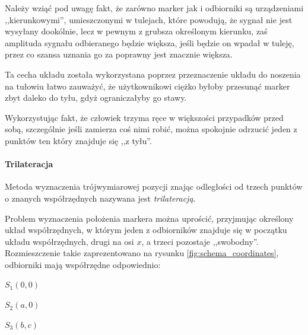 Należy wziąć pod uwagę fakt, że zarówno marker jak i odbiorniki są urządzeniami ,,kierunkowymi'', umieszczonymi w tulejach, które powodują, że sygnał nie jest wysyłany dookólnie, lecz w pewnym \ppauza z grubsza określonym \ppauza kierunku, zaś amplituda sygnału odbieranego będzie większa, jeśli będzie on wpadał w tuleję, przez co szansa uznania go za poprawny jest znacznie większa.

Ta cecha układu została wykorzystana poprzez przeznaczenie układu do noszenia na tułowiu \ppauza łatwo zauważyć, że użytkownikowi ciężko byłoby przesunąć marker zbyt daleko do tyłu, gdyż ograniczałyby go stawy. 

Wykorzystując fakt, że człowiek trzyma ręce w większości przypadków przed sobą, szczególnie jeśli zamierza coś nimi robić, można spokojnie odrzucić jeden z punktów \ppauza ten który znajduje się ,,z tyłu''.

\paragraph{Trilateracja}
\label{par:trilateration}
Metoda wyznaczenia trójwymiarowej pozycji znając odległości od trzech punktów o znanych współrzędnych nazywana jest \textit{trilateracją}.

Problem wyznaczenia położenia markera można uprościć, przyjmując określony układ współrzędnych, w którym jeden z odbiorników znajduje się w początku układu współrzędnych, drugi na osi $x$, a trzeci pozostaje ,,swobodny''. Rozmieszczenie takie zaprezentowano na rysunku \ref{fig:schema_coordinates}, odbiorniki mają współrzędne odpowiednio:
\begin{center}
 $S_1 (0, 0)$

 $S_2 (a, 0)$

 $S_3 (b, c)$
\end{center}

